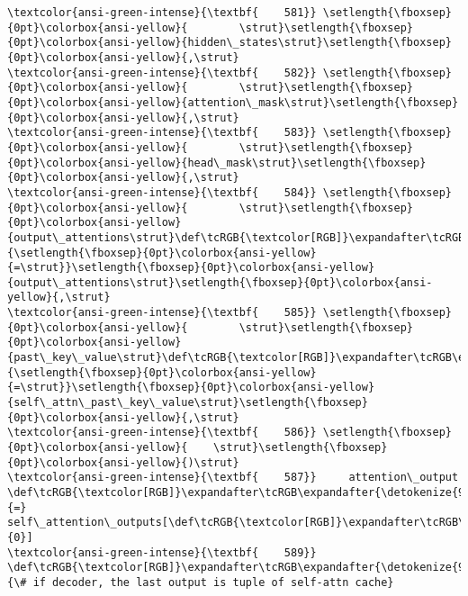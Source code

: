 \documentclass[11pt]{article}
\begin{document}
\begin{Verbatim}[commandchars=\\\{\}, frame=single, framerule=2mm, rulecolor=\color{outerrorbackground}]
\textcolor{ansi-green-intense}{\textbf{    581}} \setlength{\fboxsep}{0pt}\colorbox{ansi-yellow}{        \strut}\setlength{\fboxsep}{0pt}\colorbox{ansi-yellow}{hidden\_states\strut}\setlength{\fboxsep}{0pt}\colorbox{ansi-yellow}{,\strut}
\textcolor{ansi-green-intense}{\textbf{    582}} \setlength{\fboxsep}{0pt}\colorbox{ansi-yellow}{        \strut}\setlength{\fboxsep}{0pt}\colorbox{ansi-yellow}{attention\_mask\strut}\setlength{\fboxsep}{0pt}\colorbox{ansi-yellow}{,\strut}
\textcolor{ansi-green-intense}{\textbf{    583}} \setlength{\fboxsep}{0pt}\colorbox{ansi-yellow}{        \strut}\setlength{\fboxsep}{0pt}\colorbox{ansi-yellow}{head\_mask\strut}\setlength{\fboxsep}{0pt}\colorbox{ansi-yellow}{,\strut}
\textcolor{ansi-green-intense}{\textbf{    584}} \setlength{\fboxsep}{0pt}\colorbox{ansi-yellow}{        \strut}\setlength{\fboxsep}{0pt}\colorbox{ansi-yellow}{output\_attentions\strut}\def\tcRGB{\textcolor[RGB]}\expandafter\tcRGB\expandafter{\detokenize{98,98,98}}{\setlength{\fboxsep}{0pt}\colorbox{ansi-yellow}{=\strut}}\setlength{\fboxsep}{0pt}\colorbox{ansi-yellow}{output\_attentions\strut}\setlength{\fboxsep}{0pt}\colorbox{ansi-yellow}{,\strut}
\textcolor{ansi-green-intense}{\textbf{    585}} \setlength{\fboxsep}{0pt}\colorbox{ansi-yellow}{        \strut}\setlength{\fboxsep}{0pt}\colorbox{ansi-yellow}{past\_key\_value\strut}\def\tcRGB{\textcolor[RGB]}\expandafter\tcRGB\expandafter{\detokenize{98,98,98}}{\setlength{\fboxsep}{0pt}\colorbox{ansi-yellow}{=\strut}}\setlength{\fboxsep}{0pt}\colorbox{ansi-yellow}{self\_attn\_past\_key\_value\strut}\setlength{\fboxsep}{0pt}\colorbox{ansi-yellow}{,\strut}
\textcolor{ansi-green-intense}{\textbf{    586}} \setlength{\fboxsep}{0pt}\colorbox{ansi-yellow}{    \strut}\setlength{\fboxsep}{0pt}\colorbox{ansi-yellow}{)\strut}
\textcolor{ansi-green-intense}{\textbf{    587}}     attention\_output \def\tcRGB{\textcolor[RGB]}\expandafter\tcRGB\expandafter{\detokenize{98,98,98}}{=} self\_attention\_outputs[\def\tcRGB{\textcolor[RGB]}\expandafter\tcRGB\expandafter{\detokenize{98,98,98}}{0}]
\textcolor{ansi-green-intense}{\textbf{    589}}     \def\tcRGB{\textcolor[RGB]}\expandafter\tcRGB\expandafter{\detokenize{95,135,135}}{\# if decoder, the last output is tuple of self-attn cache}


\end{Verbatim}
\end{document}
